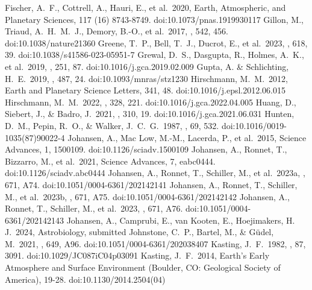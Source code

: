 \documentclass[bibyear,tradiabstract]{aa}
\begin{document}
\begin{thebibliography}{}
     Fischer, A.~F., Cottrell, A., Hauri, E., et al.\ 2020, Earth, Atmospheric, and Planetary Sciences, 117 (16) 8743-8749. doi:10.1073/pnas.1919930117
     Gillon, M., Triaud, A.~H.~M.~J., Demory, B.-O., et al.\ 2017, \nat, 542, 456. doi:10.1038/nature21360
     Greene, T.~P., Bell, T.~J., Ducrot, E., et al.\ 2023, \nat, 618, 39. doi:10.1038/s41586-023-05951-7
     Grewal, D.~S., Dasgupta, R., Holmes, A.~K., et al.\ 2019, \gca, 251, 87. doi:10.1016/j.gca.2019.02.009
     Gupta, A. \& Schlichting, H.~E.\ 2019, \mnras, 487, 24. doi:10.1093/mnras/stz1230
     Hirschmann, M.~M.\ 2012, Earth and Planetary Science Letters, 341, 48. doi:10.1016/j.epsl.2012.06.015
     Hirschmann, M.~M.\ 2022, \gca, 328, 221. doi:10.1016/j.gca.2022.04.005
     Huang, D., Siebert, J., \& Badro, J.\ 2021, \gca, 310, 19. doi:10.1016/j.gca.2021.06.031
     Hunten, D.~M., Pepin, R.~O., \& Walker, J.~C.~G.\ 1987, \icarus, 69, 532. doi:10.1016/0019-1035(87)90022-4
     Johansen, A., Mac Low, M.-M., Lacerda, P., et al.\ 2015, Science Advances, 1, 1500109. doi:10.1126/sciadv.1500109
     Johansen, A., Ronnet, T., Bizzarro, M., et al.\ 2021, Science Advances, 7, eabc0444. doi:10.1126/sciadv.abc0444
     Johansen, A., Ronnet, T., Schiller, M., et al.\ 2023a, \aap, 671, A74. doi:10.1051/0004-6361/202142141
     Johansen, A., Ronnet, T., Schiller, M., et al.\ 2023b, \aap, 671, A75. doi:10.1051/0004-6361/202142142
     Johansen, A., Ronnet, T., Schiller, M., et al.\ 2023, \aap, 671, A76. doi:10.1051/0004-6361/202142143
     Johansen, A., Camprubi, E., van Kooten, E., Hoejimakers, H. J.\ 2024, Astrobiology, submitted
     Johnstone, C.~P., Bartel, M., \& G{\"u}del, M.\ 2021, \aap, 649, A96. doi:10.1051/0004-6361/202038407
     Kasting, J.~F.\ 1982, \jgr, 87, 3091. doi:10.1029/JC087iC04p03091
     Kasting, J.~F.\ 2014, Earth's Early Atmosphere and Surface Environment (Boulder, CO: Geological Society of America), 19-28. doi:10.1130/2014.2504(04)

\end{thebibliography}
\end{document}
